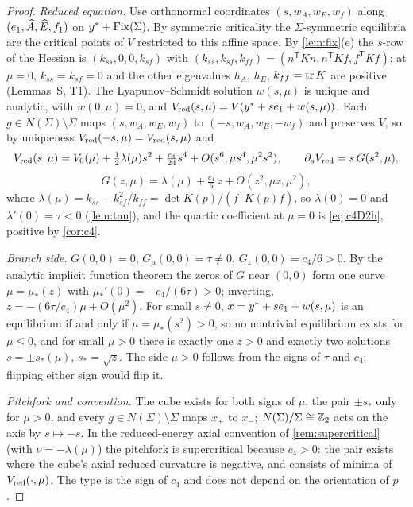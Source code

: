 \begin{proof}
\emph{Reduced equation.} Use orthonormal coordinates $(s,w_A,w_E,w_f)$ along $(e_1,\widehat{A},\widehat{E},f_1)$ on $y^{*}+\operatorname{Fix}(\Sigma)$.
By symmetric criticality the $\Sigma$-symmetric equilibria are the critical points of $V$ restricted to this affine space.
By \cref{lem:fix}(e) the $s$-row of the Hessian is $(k_{ss},0,0,k_{sf})$ with $(k_{ss},k_{sf},k_{ff})=(n^{\mathsf T}Kn,n^{\mathsf T}Kf,f^{\mathsf T}Kf)$; at
$\mu=0$, $k_{ss}=k_{sf}=0$ and the other eigenvalues $h_A$, $h_E$, $k_{ff}=\operatorname{tr} K$ are positive (Lemmas~S, T1). The
Lyapunov--Schmidt solution $w(s,\mu)$ is unique and analytic, with $w(0,\mu)=0$, and $V_{\mathrm{red}}(s,\mu)=V(y^{*}+se_1+w(s,\mu))$.
Each $g\in N(\Sigma)\setminus\Sigma$ maps $(s,w_A,w_E,w_f)$ to $(-s,w_A,w_E,-w_f)$ and preserves $V$, so by uniqueness
$V_{\mathrm{red}}(-s,\mu)=V_{\mathrm{red}}(s,\mu)$ and
\begin{equation}\label{eq:VredD2h}
V_{\mathrm{red}}(s,\mu)=V_0(\mu)+\tfrac12\lambda(\mu)s^2+\tfrac{c_4}{24}s^4+O(s^6,\mu s^4,\mu^2s^2),\qquad
\partial_sV_{\mathrm{red}}=s\,G(s^2,\mu),
\end{equation}
\[
G(z,\mu)=\lambda(\mu)+\tfrac{c_4}{6}\,z+O(z^2,\mu z,\mu^2),
\]
where $\lambda(\mu)=k_{ss}-k_{sf}^2/k_{ff}=\det K(p)/(f^{\mathsf T}K(p)f)$, so $\lambda(0)=0$ and $\lambda'(0)=\tau<0$
(\cref{lem:tau}), and the quartic coefficient at $\mu=0$ is \eqref{eq:c4D2h}, positive by \cref{cor:c4}.

\emph{Branch side.} $G(0,0)=0$, $G_\mu(0,0)=\tau\ne0$, $G_z(0,0)=c_4/6>0$. By the analytic implicit function theorem the
zeros of $G$ near $(0,0)$ form one curve $\mu=\mu_*(z)$ with $\mu_*'(0)=-c_4/(6\tau)>0$; inverting,
$z=-(6\tau/c_4)\mu+O(\mu^2)$. For small $s\ne0$, $x=y^{*}+se_1+w(s,\mu)$ is an equilibrium if and only if $\mu=\mu_*(s^2)>0$,
so no nontrivial equilibrium exists for $\mu\le0$, and for small $\mu>0$ there is exactly one $z>0$ and exactly two
solutions $s=\pm s_*(\mu)$, $s_*=\sqrt z$. The side $\mu>0$ follows from the signs of $\tau$ and $c_4$; flipping either
sign would flip it.

\emph{Pitchfork and convention.} The cube exists for both signs of $\mu$, the pair $\pm s_*$ only for $\mu>0$, and every
$g\in N(\Sigma)\setminus\Sigma$ maps $x_+$ to $x_-$; $N(\Sigma)/\Sigma\cong\mathbb{Z}_2$ acts on the axis by $s\mapsto-s$. In the
reduced-energy axial convention of \cref{rem:supercritical} (with $\nu=-\lambda(\mu)$) the pitchfork is supercritical
because $c_4>0$: the pair exists where the cube's axial reduced curvature is negative, and consists of minima of
$V_{\mathrm{red}}(\cdot,\mu)$. The type is the sign of $c_4$ and does not depend on the orientation of $p$.


\end{proof}
